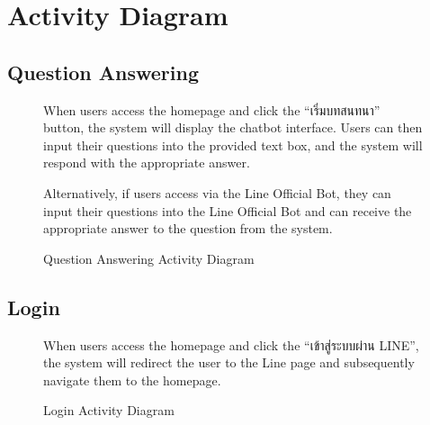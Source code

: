 \documentclass[12pt,oneside,openright,a4paper]{cpe-english-project}
\begin{document}
\newpage
    \section{Activity Diagram}
      \subsection{Question Answering}
      \begin{figure}[H]
        \centering
        \caption{Question Answering Activity Diagram}\label{fig:AD_FAQ}
        \begin{justify}
          \qquad When users access the homepage and click the “\textthai{เริ่มบทสนทนา}” button, the system will display the chatbot interface. Users can then input their questions into the provided text box, and the system will respond with the appropriate answer. \par
          \qquad Alternatively, if users access via the Line Official Bot, they can input their questions into the Line Official Bot and can receive the appropriate answer to the question from the system. \par
        \end{justify}
      \end{figure}

      \subsection{Login}
      \begin{figure}[H]
        \centering
        \caption{Login Activity Diagram}\label{fig:AD_Login}
        \begin{justify}
          \qquad When users access the homepage and click the “\textthai{เข้าสู่ระบบผ่าน} LINE”, the system will redirect the user to the Line page and subsequently navigate them to the homepage. \par
        \end{justify}
      \end{figure}
\newpage
\end{document}
